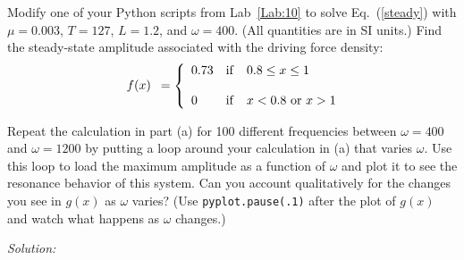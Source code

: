 \begin{enumerate}
\probtwo \label{P:11.1}
\begin{enumerate}
\subprob \label{P:11.1a} Modify one of your Python scripts
    from Lab~\ref{Lab:10} to solve Eq.~(\ref{steady}) with
    $\mu=0.003$, $T=127$, $L=1.2$, and $\omega=400$. (All
    quantities are in SI units.) Find the steady-state
    amplitude associated with the driving force density:
    \begin{equation}
    \begin{array}{c}
     \\
    f(x) \\
     \\
    \end{array}
    =
    \left\{
    \begin{array}{ll}
    0.73 & {\rm if~~~} 0.8 \le x \le 1 \\
     & \\
    0 & {\rm if~~~} x<0.8 \textrm{ or } x>1 \\
    \end{array}
    \right.
    \end{equation}


\subprob \label{P:11.1b}Repeat the calculation in part (a)
for 100 different frequencies between $\omega=400$ and
$\omega=1200$ by putting a loop around your calculation in
(a) that varies $\omega$. Use this loop to load the maximum
amplitude as a function of $\omega$ and plot it to see the
resonance behavior of this system. Can you account
qualitatively for the changes you see in $g(x)$ as $\omega$
varies? (Use \texttt{pyplot.pause(.1)} after the plot of $g(x)$ and
watch what happens as $\omega$ changes.)


\end{enumerate}
\end{enumerate}
\ifsolutions
\textit{Solution:}\\
